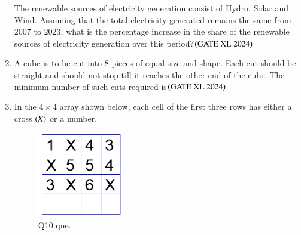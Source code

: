 \documentclass[journal]{IEEEtran}
\begin{document}
\begin{enumerate}
    The renewable sources of electricity generation consist of Hydro, Solar and Wind. Assuming that the total electricity generated remains the same from $2007$ to $2023$, what is the percentage increase in the share of the renewable sources of electricity generation over this period?\hfill $\left(\text{GATE XL 2024}\right)$

    \begin{enumerate}
    \end{enumerate}

    \item A cube is to be cut into 8 pieces of equal size and shape. Each cut should be straight and should not stop till it reaches the other end of the cube. The minimum number of such cuts required is\hfill $\left(\text{GATE XL 2024}\right)$
    \begin{enumerate}
    \end{enumerate}

    \item In the $4 \times 4$ array shown below, each cell of the first three rows has either a cross $\left(X\right)$ or a number.

    \begin{figure}[H]
        \centering
        \includegraphics[width=0.5\columnwidth]{figs/xl2024_q10_que.png}
        \caption{Q10 que.}
    \end{figure}


\end{enumerate}
\end{document}
